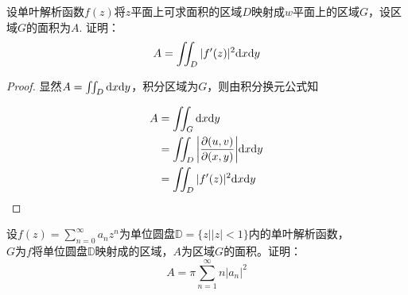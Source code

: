 \begin{proposition}
    
    设单叶解析函数$f(z)$将$z$平面上可求面积的区域$D$映射成$w$平面上的区域$G$，设区域$G$的面积为$A$. 证明：
    \[ A = \iint_{D}{|f'(z)|^2}\mathrm{d} x\mathrm{d} y\]

\end{proposition}

\begin{proof}
    
    显然$A = \iint_{D}\mathrm{d} x\mathrm{d} y$，积分区域为$G$，则由积分换元公式知

    \begin{align*}
        A & = \iint_{G}\mathrm{d} x\mathrm{d} y \\
          & = \iint_{D}{\left| \dfrac{\partial(u, v)}{\partial(x, y)} \right|}\mathrm{d} x\mathrm{d} y \\
          & = \iint_{D}{|f'(z)|^2}\mathrm{d} x\mathrm{d} y
    \end{align*}

\end{proof}

\begin{proposition}
    
    设$f(z) = \sum\limits_{n = 0}^{\infty}{a_nz^n}$为单位圆盘$\mathbb{D} = \{z\big| |z| < 1\}$内的单叶解析函数，\\
    $G$为$f$将单位圆盘$\mathbb{D}$映射成的区域，$A$为区域$G$的面积。证明：
    \[A =  \pi\sum\limits_{n = 1}^{\infty}{n|a_n|^2}\]

\end{proposition}

